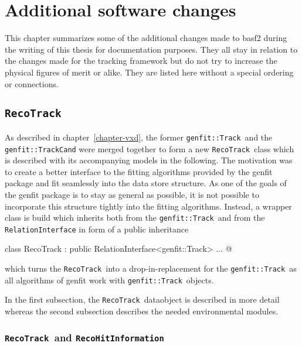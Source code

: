 \newcommand{\RecoTrack}{\texttt{RecoTrack}\ }
\newcommand{\Track}{\texttt{genfit::Track}\ }
\newcommand{\Hit}{\texttt{RecoHitInformation}\ }
\chapter{Additional software changes} \label{chapter-addon}

This chapter summarizes some of the additional changes made to basf2 during the writing of this thesis for documentation purposes. They all stay in relation to the changes made for the tracking framework but do not try to increase the physical figures of merit or alike. They are listed here without a special ordering or connections.

\section{\texttt{RecoTrack}}
As described in chapter~\ref{chapter-vxd}, the former \Track and the \texttt{genfit::TrackCand} were merged together to form a new \RecoTrack class which is described with its accompanying models in the following. The motivation was to create a better interface to the fitting algorithms provided by the genfit package and fit seamlessly into the data store structure. As one of the goals of the genfit package is to stay as general as possible, it is not possible to incorporate this structure tightly into the fitting algorithms. Instead, a wrapper class is build which inherits both from the \Track and from the \texttt{RelationInterface} in form of a public inheritance 
\begin{center}
  \lstset{escapechar=@,style=customC}
  \lstinline@ class RecoTrack : public RelationInterface<genfit::Track> { ... }@
\end{center}
which turns the \RecoTrack into a drop-in-replacement for the \Track as all algorithms of genfit work with \Track objects. 

In the first subsection, the \RecoTrack dataobject is described in more detail whereas the second subsection describes the needed environmental modules.

\subsection{\RecoTrack and \Hit}

